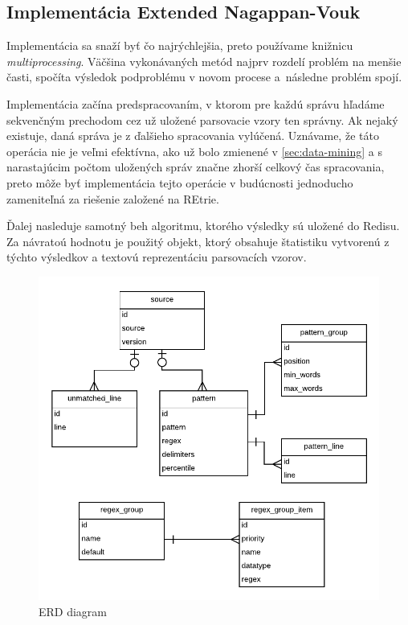 \subsection{Implementácia Extended Nagappan-Vouk}
Implementácia sa snaží byť čo najrýchlejšia, preto používame knižnicu \emph{multiprocessing}. Väčšina vykonávaných metód najprv rozdelí problém na menšie časti, spočíta výsledok podproblému v novom procese a~následne problém spojí. 
\par Implementácia začína predspracovaním, v ktorom pre každú sprá\-vu hľadáme sekvenčným prechodom cez už uložené parsovacie vzory ten správny. Ak nejaký existuje, daná správa je z ďalšieho spracovania vylúčená. Uznávame, že táto operácia nie je veľmi efektívna, ako už bolo zmienené v \ref{sec:data-mining} a s narastajúcim počtom uložených správ značne zhorší celkový čas spracovania, preto môže byť implementácia tejto operácie v budúcnosti jednoducho zameniteľná za riešenie založené na REtrie.
\par Ďalej nasleduje samotný beh algoritmu, ktorého výsledky sú ulo\-žené do Redisu. Za návratoú hodnotu je použitý objekt, ktorý obsahuje štatistiku vytvorenú z týchto výsledkov a textovú reprezentáciu parsovacích vzorov.

\begin{figure}[htbp]
 \centering 
 \begin{minipage}{0.95\linewidth}
 	\centering
 	\includegraphics[width=\textwidth]{Images/thesis-erd.pdf}
 \end{minipage}
  \caption{ERD diagram}
  \label{fig:use-cases}
\end{figure}


